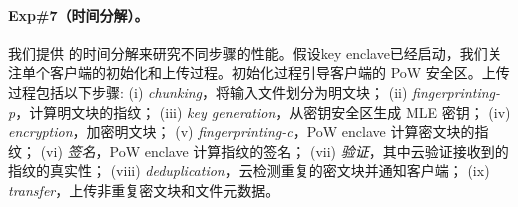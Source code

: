 \paragraph{Exp\#7（时间分解）。} 我们提供 \sysname 的时间分解来研究不同步骤的性能。假设key enclave已经启动，我们关注单个客户端的初始化和上传过程。初始化过程引导客户端的 PoW 安全区。上传过程包括以下步骤: (i) \textit{ chunking}，将输入文件划分为明文块； (ii) \textit{ fingerprinting-p}，计算明文块的指纹； (iii) \textit{ key generation}，从密钥安全区生成 MLE 密钥； (iv) \textit{ encryption}，加密明文块； (v) \textit{ fingerprinting-c}，PoW enclave 计算密文块的指纹； (vi) \textit{ 签名}，PoW enclave 计算指纹的签名； (vii) \textit{ 验证}，其中云验证接收到的指纹的真实性； (viii) \textit{ deduplication}，云检测重复的密文块并通知客户端； (ix) \textit{ transfer}，上传非重复密文块和文件元数据。


